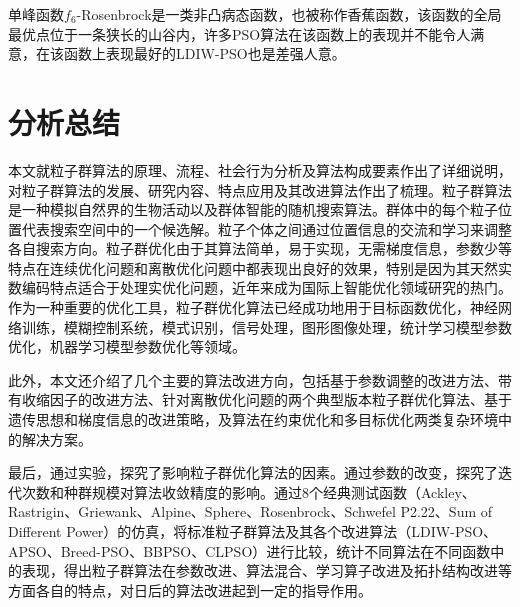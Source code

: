 单峰函数$f_6$-Rosenbrock是一类非凸病态函数，也被称作香蕉函数，该函数的全局最优点位于一条狭长的山谷内，许多PSO算法在该函数上的表现并不能令人满意，在该函数上表现最好的LDIW-PSO也是差强人意。
\section{分析总结}
本文就粒子群算法的原理、流程、社会行为分析及算法构成要素作出了详细说明，对粒子群算法的发展、研究内容、特点应用及其改进算法作出了梳理。粒子群算法是一种模拟自然界的生物活动以及群体智能的随机搜索算法。群体中的每个粒子位置代表搜索空间中的一个候选解。粒子个体之间通过位置信息的交流和学习来调整各自搜索方向。粒子群优化由于其算法简单，易于实现，无需梯度信息，参数少等特点在连续优化问题和离散优化问题中都表现出良好的效果，特别是因为其天然实数编码特点适合于处理实优化问题，近年来成为国际上智能优化领域研究的热门。作为一种重要的优化工具，粒子群优化算法已经成功地用于目标函数优化，神经网络训练，模糊控制系统，模式识别，信号处理，图形图像处理，统计学习模型参数优化，机器学习模型参数优化等领域。

此外，本文还介绍了几个主要的算法改进方向，包括基于参数调整的改进方法、带有收缩因子的改进方法、针对离散优化问题的两个典型版本粒子群优化算法、基于遗传思想和梯度信息的改进策略，及算法在约束优化和多目标优化两类复杂环境中的解决方案。

最后，通过实验，探究了影响粒子群优化算法的因素。通过参数的改变，探究了迭代次数和种群规模对算法收敛精度的影响。通过8个经典测试函数（Ackley、Rastrigin、Griewank、Alpine、Sphere、Rosenbrock、Schwefel P2.22、Sum of Different Power）的仿真，将标准粒子群算法及其各个改进算法（LDIW-PSO、APSO、Breed-PSO、BBPSO、CLPSO）进行比较，统计不同算法在不同函数中的表现，得出粒子群算法在参数改进、算法混合、学习算子改进及拓扑结构改进等方面各自的特点，对日后的算法改进起到一定的指导作用。





